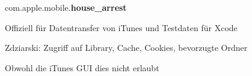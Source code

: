 \begin{frame}
	\centering
	com.apple.mobile.\textbf{house\_arrest}
	\begin{block}{}
		Offiziell für Datentransfer von iTunes und Testdaten für Xcode
	\end{block}
	\begin{block}{}
		Zdziarski: Zugriff auf Library, Cache, Cookies, bevorzugte Ordner
	\end{block}
	\begin{block}{}
		Obwohl die iTunes GUI dies nicht erlaubt
	\end{block}
\end{frame}